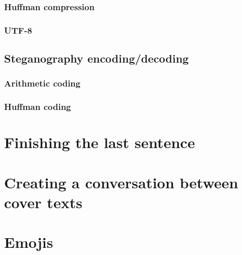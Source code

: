 \subsubsection{Huffman compression}
\label{sec:huffmanCompression}

\subsubsection{UTF-8}
\label{sec:utf8}

\subsection{Steganography encoding/decoding}
\label{sec:steganographyEncodingDecoding}

\subsubsection{Arithmetic coding}
\label{sec:arithmeticCoding}

\subsubsection{Huffman coding}
\label{sec:huffmanCoding}

\section{Finishing the last sentence}
\label{sec:finishingTheLastSentence}

\section{Creating a conversation between cover texts}
\label{sec:creatingAConversationBetweenCoverTexts}

\section{Emojis}
\label{sec:emojis}
